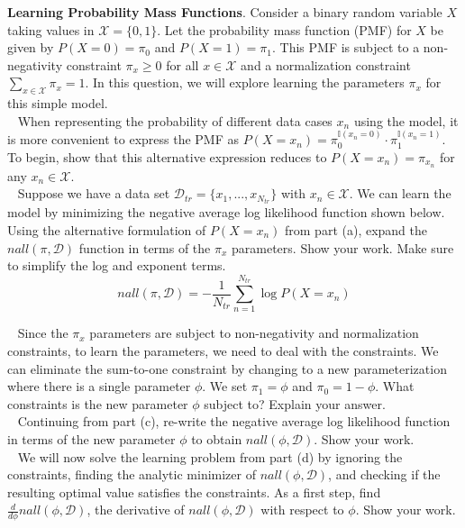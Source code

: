 \documentclass[11pt]{article}
\begin{document}
\begin{problem}{30}\textbf{Learning Probability Mass Functions}. Consider a binary random variable $X$ taking values in $\mathcal{X}=\{0,1\}$. Let the probability mass function (PMF) for $X$ be given by $P(X=0)=\pi_0$ and $P(X=1)=\pi_1$. This PMF is subject to a non-negativity constraint $\pi_x\geq 0$ for all $x\in\mathcal{X}$ and a normalization constraint $\sum_{x\in\mathcal{X}}\pi_x=1$. In this question, we will explore learning the parameters $\pi_x$ for this simple model.\\

~ When representing the probability of different data cases $x_n$ using the model, it is more convenient to express the PMF as $P(X=x_n)=\pi_0^{\mathbb{I}(x_n=0)}\cdot \pi_1^{\mathbb{I}(x_n=1)}$. 
To begin, show that this alternative expression reduces to $P(X=x_n)=\pi_{x_n}$ for any $x_n\in\mathcal{X}$.\\

~ Suppose we have a data set $\mathcal{D}_{tr}=\{x_1,...,x_{N_{tr}}\}$ with $x_n\in\mathcal{X}$. We can learn the model by minimizing the negative average log likelihood function shown below. Using the alternative formulation of $P(X=x_n)$ from part (a), expand the $nall(\pi,\mathcal{D})$ function in terms of the $\pi_x$ parameters. Show your work. Make sure to simplify the log and exponent terms. 
%
$$nall(\pi,\mathcal{D})=-\frac{1}{N_{tr}}\sum_{n=1}^{N_{tr}}\log P(X=x_n)$$

~ Since the $\pi_x$ parameters are subject to non-negativity and normalization constraints, to learn the parameters, we need to deal with the constraints. We can eliminate the sum-to-one constraint by changing to a new parameterization where there is a single parameter $\phi$. We set $\pi_1=\phi$ and $\pi_0=1-\phi$. What constraints is the new parameter $\phi$ subject to? Explain your answer.\\

~ Continuing from part (c), re-write the negative average log likelihood function in terms of the new parameter $\phi$ to obtain $nall(\phi,\mathcal{D})$. Show your work.\\

~ We will now solve the learning problem from part (d) by ignoring the constraints, finding the analytic minimizer of $nall(\phi,\mathcal{D})$, and checking if the resulting optimal value satisfies the constraints. As a first step, find $\frac{d}{d\phi} nall(\phi,\mathcal{D})$, the derivative of $nall(\phi,\mathcal{D})$ with respect to $\phi$. Show your work.\\


\end{problem}
\end{document}
